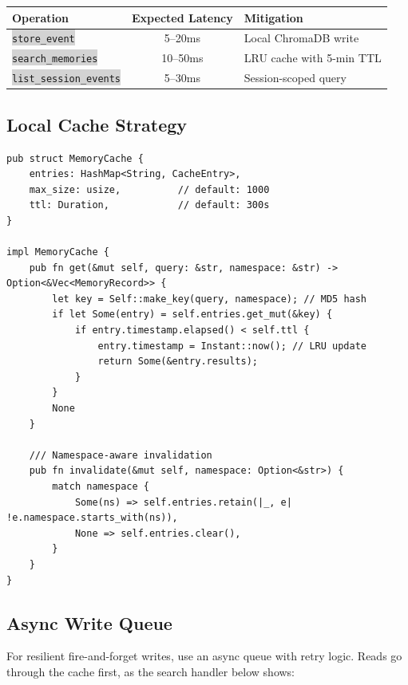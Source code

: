 \documentclass[11pt,letterpaper]{article}
\renewcommand{\arraystretch}{1.4}
\newcommand{\code}[1]{\texttt{\small\colorbox{lightgray}{#1}}}
\begin{document}
\begin{center}
\renewcommand{\arraystretch}{1.5}
\begin{tabular}{L{4.2cm} c L{6cm}}
\textbf{\color{cloudblue}Operation} & \textbf{\color{cloudblue}Expected Latency} & \textbf{\color{cloudblue}Mitigation} \\
\midrule
{}
\code{store\_event} & 5--20ms & Local ChromaDB write \\
\code{search\_memories} & 10--50ms & LRU cache with 5-min TTL \\
\code{list\_session\_events} & 5--30ms & Session-scoped query \\
\bottomrule
\end{tabular}
\end{center}

\subsection{Local Cache Strategy}

\begin{lstlisting}[caption={LRU cache with TTL (Rust)}]
pub struct MemoryCache {
    entries: HashMap<String, CacheEntry>,
    max_size: usize,          // default: 1000
    ttl: Duration,            // default: 300s
}

impl MemoryCache {
    pub fn get(&mut self, query: &str, namespace: &str) -> Option<&Vec<MemoryRecord>> {
        let key = Self::make_key(query, namespace); // MD5 hash
        if let Some(entry) = self.entries.get_mut(&key) {
            if entry.timestamp.elapsed() < self.ttl {
                entry.timestamp = Instant::now(); // LRU update
                return Some(&entry.results);
            }
        }
        None
    }

    /// Namespace-aware invalidation
    pub fn invalidate(&mut self, namespace: Option<&str>) {
        match namespace {
            Some(ns) => self.entries.retain(|_, e| !e.namespace.starts_with(ns)),
            None => self.entries.clear(),
        }
    }
}
\end{lstlisting}

\subsection{Async Write Queue}

For resilient fire-and-forget writes, use an async queue with retry logic. Reads go through the cache first, as the search handler below shows:
\end{document}

